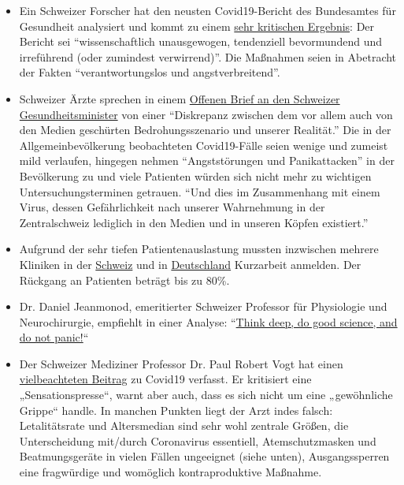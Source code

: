 \begin{itemize}
{  informieren irreführend.''}
\item
  Ein Schweizer Forscher hat den neusten Covid19-Bericht des Bundesamtes
  für Gesundheit analysiert und kommt zu einem
  \href{https://covid-19-fakten.blogspot.com/2020/04/die-analyse-des-aktuellen.html}{sehr
  kritischen Ergebnis}: Der Bericht sei ``wissenschaftlich unausgewogen,
  tendenziell bevormundend und irreführend (oder zumindest
  verwirrend)''. Die Maßnahmen seien in Abetracht der Fakten
  ``verantwortungslos und angstverbreitend''.
\item
  Schweizer Ärzte sprechen in einem
  \href{https://www.rontalpraxis.ch/aktuelles}{Offenen Brief an den
  Schweizer Gesundheitsminister} von einer ``Diskrepanz zwischen dem vor
  allem auch von den Medien geschürten Bedrohungsszenario und unserer
  Realität.'' Die in der Allgemeinbevölkerung beobachteten Covid19-Fälle
  seien wenige und zumeist mild verlaufen, hingegen nehmen
  ``Angststörungen und Panikattacken'' in der Bevölkerung zu und viele
  Patienten würden sich nicht mehr zu wichtigen Untersuchungsterminen
  getrauen. ``Und dies im Zusammenhang mit einem Virus, dessen
  Gefährlichkeit nach unserer Wahrnehmung in der Zentralschweiz
  lediglich in den Medien und in unseren Köpfen existiert.''
\item
  Aufgrund der sehr tiefen Patientenauslastung mussten inzwischen
  mehrere Kliniken in der
  \href{https://www.20min.ch/schweiz/news/story/Spitaeler-28949526}{Schweiz}
  und in
  \href{https://www.spiegel.de/wirtschaft/unternehmen/trotz-corona-pandemie-warum-kliniken-jetzt-kurzarbeit-anmelden-a-3dc61bc9-fb12-4298-8022-bb4c2be39d7d}{Deutschland}
  Kurzarbeit anmelden. Der Rückgang an Patienten beträgt bis zu 80\%.
\item
  Dr. Daniel Jeanmonod, emeritierter Schweizer Professor für Physiologie
  und Neurochirurgie, empfiehlt in einer Analyse:
  ``\href{https://off-guardian.org/2020/04/07/think-deep-do-good-science-and-do-not-panic/}{Think
  deep, do good science, and do not panic!}``
\item
  Der Schweizer Mediziner Professor Dr. Paul Robert Vogt hat einen
  \href{https://www.mittellaendische.ch/2020/04/07/covid-19-eine-zwischenbilanz-oder-eine-analyse-der-moral-der-medizinischen-fakten-sowie-der-aktuellen-und-zuk\%C3\%BCnftigen-politischen-entscheidungen/}{vielbeachteten
  Beitrag} zu Covid19 verfasst. Er kritisiert eine „Sensationspresse``,
  warnt aber auch, dass es sich nicht um eine „gewöhnliche Grippe``
  handle. In manchen Punkten liegt der Arzt indes falsch: Letalitätsrate
  und Altersmedian sind sehr wohl zentrale Größen, die Unterscheidung
  mit/durch Coronavirus essentiell, Atemschutz­masken und
  Beatmungsgeräte in vielen Fällen ungeeignet (siehe unten),
  Ausgangssperren eine fragwürdige und womöglich kontraproduktive
  Maßnahme.
\end{itemize}

